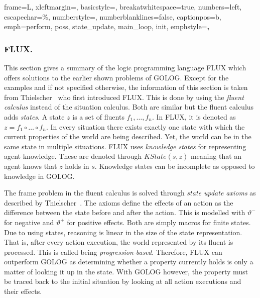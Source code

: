  { %
  frame=L,
  xleftmargin=\parindent,
  basicstyle=\footnotesize\ttfamily,
  breakatwhitespace=true,
  numbers=left,
  escapechar=\%,
  numberstyle=\tiny,
  numberblanklines=false,
  captionpos=b,
  emph={perform, poss, state\_update, main\_loop, init},
  emphstyle=\textbf,
}
%
\lstset{style=flux} %
\subsubsection{FLUX.}\label{fun:apl_flux}
This section gives a summary of the logic programming language FLUX which offers solutions to the earlier shown problems of GOLOG. Except for the examples and if not specified otherwise, the information of this section is taken from Thielscher~\cite{thielscher_flux:_2005} who first introduced FLUX. This is done by using the \emph{fluent calculus} instead of the situation calculus. Both are similar but the fluent calculus adds \emph{states}. A state $z$ is a set of fluents $f_1,\dotsc,f_n$. In FLUX, it is denoted as $z = f_1 \circ\dotsc\circ f_n$. In every situation there exists exactly one state with which the current properties of the world are being described. Yet, the world can be in the same state in multiple situations. FLUX uses \emph{knowledge states} for representing agent knowledge. These are denoted through $\textit{KState}(s,z)$ meaning that an agent knows that $z$ holds in $s$. Knowledge states can be incomplete as opposed to knowledge in GOLOG.

The frame problem in the fluent calculus is solved through \emph{state update axioms} as described by Thielscher~\cite{thielscher_situation_1999}. The axioms define the effects of an action as the difference between the state before and after the action. This is modelled with $\vartheta^-$ for negative and $\vartheta^+$ for positive effects. Both are simply macros for finite states. Due to using states, reasoning is linear in the size of the state representation. That is, after every action execution, the world represented by its fluent is processed. This is called being \emph{progression-based}. Therefore, FLUX can outperform GOLOG as determining whether a property currently holds is only a matter of looking it up in the state. With GOLOG however, the property must be traced back to the initial situation by looking at all action executions and their effects.


